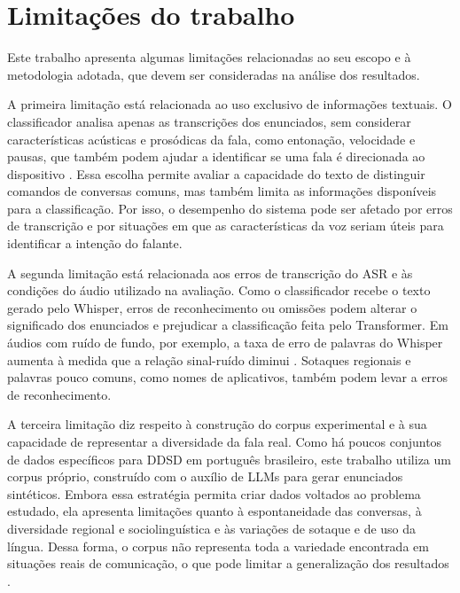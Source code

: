 \documentclass[
    12pt,                %
    openright,           %
    oneside,             %
    a4paper,             %
    english,             %
    brazil               %
]{abntex2}
\begin{document}

\section{Limitações do trabalho}
\label{sec:limitacoes}

Este trabalho apresenta algumas limitações relacionadas ao seu escopo e à metodologia adotada, que devem ser consideradas na análise dos resultados.

A primeira limitação está relacionada ao uso exclusivo de informações textuais. O classificador analisa apenas as transcrições dos enunciados, sem considerar características acústicas e prosódicas da fala, como entonação, velocidade e pausas, que também podem ajudar a identificar se uma fala é direcionada ao dispositivo \cite{Norouzian2019, Krishna2024}. Essa escolha permite avaliar a capacidade do texto de distinguir comandos de conversas comuns, mas também limita as informações disponíveis para a classificação. Por isso, o desempenho do sistema pode ser afetado por erros de transcrição e por situações em que as características da voz seriam úteis para identificar a intenção do falante.

A segunda limitação está relacionada aos erros de transcrição do ASR e às condições do áudio utilizado na avaliação. Como o classificador recebe o texto gerado pelo Whisper, erros de reconhecimento ou omissões podem alterar o significado dos enunciados e prejudicar a classificação feita pelo Transformer. Em áudios com ruído de fundo, por exemplo, a taxa de erro de palavras do Whisper aumenta à medida que a relação sinal-ruído diminui \cite{Radford2023}. Sotaques regionais e palavras pouco comuns, como nomes de aplicativos, também podem levar a erros de reconhecimento.

A terceira limitação diz respeito à construção do corpus experimental e à sua capacidade de representar a diversidade da fala real. Como há poucos conjuntos de dados específicos para DDSD em português brasileiro, este trabalho utiliza um corpus próprio, construído com o auxílio de LLMs para gerar enunciados sintéticos. Embora essa estratégia permita criar dados voltados ao problema estudado, ela apresenta limitações quanto à espontaneidade das conversas, à diversidade regional e sociolinguística e às variações de sotaque e de uso da língua. Dessa forma, o corpus não representa toda a variedade encontrada em situações reais de comunicação, o que pode limitar a generalização dos resultados \cite{CORAA2023}.
\end{document}
